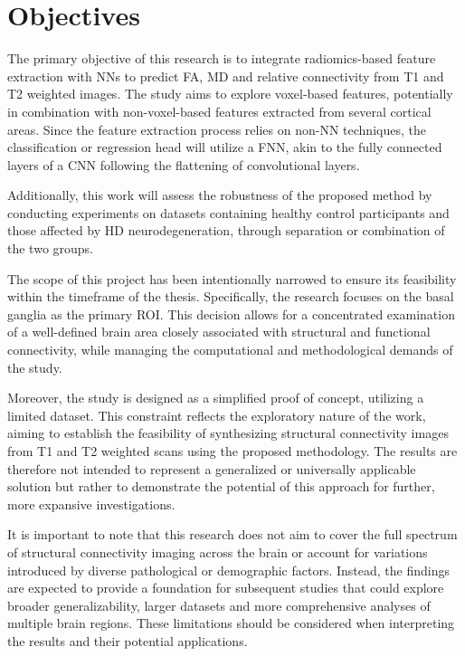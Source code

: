 \section{Objectives}

The primary objective of this research is to integrate radiomics-based feature extraction with \ac{NN}s to predict \ac{FA}, \ac{MD} and relative connectivity from T1 and T2 weighted images. The study aims to explore voxel-based features, potentially in combination with non-voxel-based features extracted from several cortical areas. Since the feature extraction process relies on non-\ac{NN} techniques, the classification or regression head will utilize a \ac{FNN}, akin to the fully connected layers of a \ac{CNN} following the flattening of convolutional layers.\par
Additionally, this work will assess the robustness of the proposed method by conducting experiments on datasets containing healthy control participants and those affected by \ac{HD} neurodegeneration, through separation or combination of the two groups.\par
The scope of this project has been intentionally narrowed to ensure its feasibility within the timeframe of the thesis. Specifically, the research focuses on the basal ganglia as the primary \ac{ROI}. This decision allows for a concentrated examination of a well-defined brain area closely associated with structural and functional connectivity, while managing the computational and methodological demands of the study.\par
Moreover, the study is designed as a simplified proof of concept, utilizing a limited dataset. This constraint reflects the exploratory nature of the work, aiming to establish the feasibility of synthesizing structural connectivity images from T1 and T2 weighted scans using the proposed methodology. The results are therefore not intended to represent a generalized or universally applicable solution but rather to demonstrate the potential of this approach for further, more expansive investigations.\par
It is important to note that this research does not aim to cover the full spectrum of structural connectivity imaging across the brain or account for variations introduced by diverse pathological or demographic factors. Instead, the findings are expected to provide a foundation for subsequent studies that could explore broader generalizability, larger datasets and more comprehensive analyses of multiple brain regions. These limitations should be considered when interpreting the results and their potential applications.

